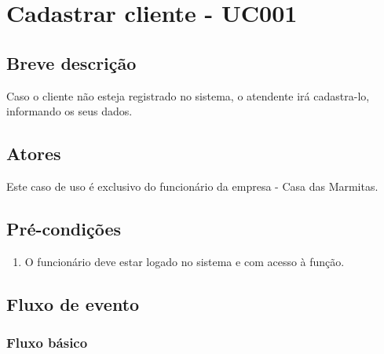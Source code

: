 \chapter{Cadastrar cliente - UC001} \label{uc001}
 
\section{Breve descrição}
 
Caso o cliente não esteja registrado no sistema, o atendente irá cadastra-lo, informando os seus dados.

\section{Atores}

Este caso de uso é exclusivo do funcionário da empresa - Casa das Marmitas.

\section{Pré-condições}

\begin{enumerate}
	\item O funcionário deve estar logado no sistema e com acesso à função.
\end{enumerate}

\section{Fluxo de evento}

\subsection{Fluxo básico}

